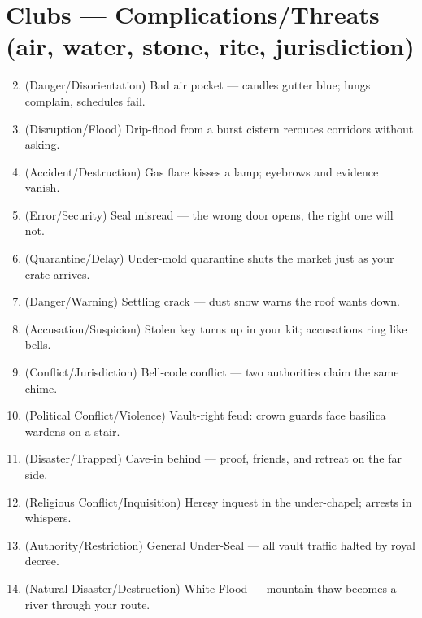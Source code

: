 \section*{Clubs --- Complications/Threats (air, water, stone, rite, jurisdiction)}
\label{sec:aeler-complications}
\begin{enumerate}
\setcounter{enumi}{1}
\item {} (Danger/Disorientation) Bad air pocket --- candles gutter blue; lungs complain, schedules fail.
\item {} (Disruption/Flood) Drip-flood from a burst cistern reroutes corridors without asking.
\item {} (Accident/Destruction) Gas flare kisses a lamp; eyebrows and evidence vanish.
\item {} (Error/Security) Seal misread --- the wrong door opens, the right one will not.
\item {} (Quarantine/Delay) Under-mold quarantine shuts the market just as your crate arrives.
\item {} (Danger/Warning) Settling crack --- dust snow warns the roof wants down.
\item {} (Accusation/Suspicion) Stolen key turns up in your kit; accusations ring like bells.
\item {} (Conflict/Jurisdiction) Bell-code conflict --- two authorities claim the same chime.
\item {} (Political Conflict/Violence) Vault-right feud: crown guards face basilica wardens on a stair.
\item {} (Disaster/Trapped) Cave-in behind --- proof, friends, and retreat on the far side.
\item {} (Religious Conflict/Inquisition) Heresy inquest in the under-chapel; arrests in whispers.
\item {} (Authority/Restriction) General Under-Seal --- all vault traffic halted by royal decree.
\item {} (Natural Disaster/Destruction) White Flood --- mountain thaw becomes a river through your route.
\end{enumerate}

